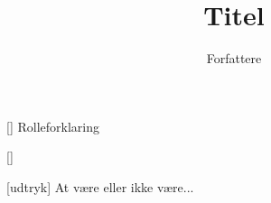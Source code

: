 \documentclass[a4paper,11pt]{article}
\title{Titel}
\author{Forfattere}
\begin{document}
\maketitle

\begin{roles}
[] Rolleforklaring
\end{roles}

\begin{props}
[]
\end{props}


\begin{sketch}


[udtryk] At være eller ikke være... 



\end{sketch}
\end{document}
